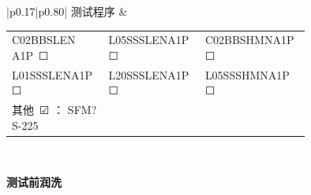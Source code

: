 \documentclass[UTF8,10pt,a4paper,fontset=fandol]{ctexart}
\newcommand{\fieldvalue}[1]{#1}
\newcommand{\handwritten}[1]{#1}
\newcommand{\checkboxfield}[1]{\ifstrequal{#1}{checked}{☑}{\ifstrequal{#1}{unclear}{?}{☐}}}
\begin{document}
\vspace{2pt}
\begin{tabular}{|p{0.17\linewidth}|p{0.80\linewidth}|}
\hline
测试程序 &
\begin{tabular}{p{0.25\linewidth}p{0.25\linewidth}p{0.25\linewidth}}
C02BBSLEN A1P\,%
\fieldvalue{\checkboxfield{unchecked}}
&
L05SSSLENA1P\,%
\fieldvalue{\checkboxfield{unchecked}}
&
C02BBSHMNA1P\,%
\fieldvalue{\checkboxfield{unchecked}}
\\
L01SSSLENA1P\,%
\fieldvalue{\checkboxfield{unchecked}}
&
L20SSSLENA1P\,%
\fieldvalue{\checkboxfield{unchecked}}
&
L05SSSHMNA1P\,%
\fieldvalue{\checkboxfield{unchecked}}
\\
其他\,%
\fieldvalue{\checkboxfield{checked}}
：
\fieldvalue{\handwritten{SFM?S-225}}
&
&
\end{tabular}
\\ \hline
\end{tabular}

\vspace{2pt}
\noindent\textbf{测试前润洗}
\end{document}
